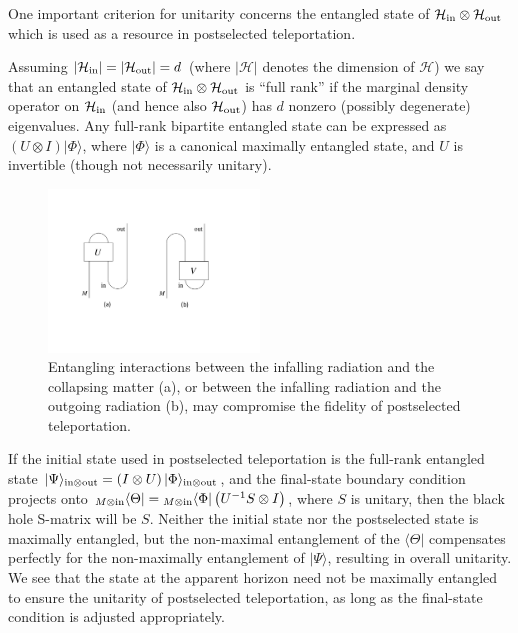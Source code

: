 \documentclass[11pt]{article}
\begin{document}
One important criterion for unitarity concerns the entangled state of $\mathcal{H}_{\rm in}\otimes \mathcal{H}_{\rm out}$ which is used as a resource in postselected teleportation.

Assuming $|\mathcal{H}_{\rm in}| = |\mathcal{H}_{\rm out}| = d$ (where $|\mathcal{H}|$ denotes the dimension of $\mathcal{H}$) we say that an entangled state of $\mathcal{H}_{\rm in}\otimes \mathcal{H}_{\rm out}$ is ``full rank'' if the marginal density operator on $\mathcal{H}_{\rm in}$ (and hence also  $\mathcal{H}_{\rm out}$) has $d$ nonzero (possibly degenerate) eigenvalues. Any full-rank bipartite entangled state can be expressed as $\left(U\otimes I \right)|\Phi\rangle$, where $|\Phi\rangle$ is a canonical maximally entangled state, and $U$ is invertible (though not necessarily unitary). 

\begin{figure}[t]
\begin{center}
\includegraphics[width=0.5\textwidth]{entangling.pdf}
\end{center}
\caption{Entangling interactions between the infalling radiation and the collapsing matter (a), or between the infalling radiation and the outgoing radiation (b), may compromise the fidelity of postselected teleportation.}
\label{fig:entangling}
\end{figure}

If the initial state used in postselected teleportation is  the full-rank entangled state $|\Psi\rangle_{{\rm in}\otimes {\rm out}}=\left(I\otimes U\right)|\Phi\rangle_{{\rm in}\otimes {\rm out}}$, and the final-state boundary condition projects onto $ {}_{M\otimes{\rm in}}\langle\Theta |={}_{M\otimes{\rm in}}\langle \Phi|\left(U^{-1}S\otimes I\right)$, where $S$ is unitary, then the black hole S-matrix will be $S$. Neither the initial state nor the postselected state is maximally entangled, but the non-maximal entanglement of the $\langle \Theta|$ compensates perfectly for the non-maximally entanglement of $|\Psi\rangle$, resulting in overall unitarity. We see that the state at the apparent horizon need not be maximally entangled to ensure the unitarity of postselected teleportation, as long as the final-state condition is adjusted appropriately.
\end{document}
